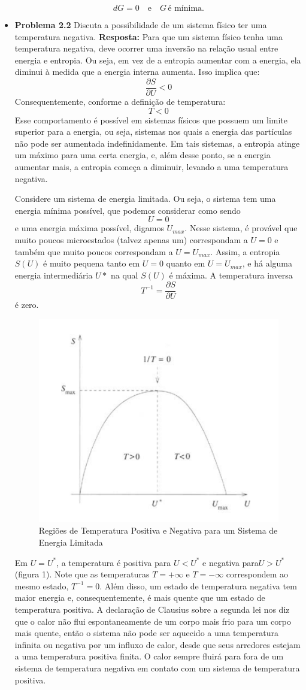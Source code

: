 \documentclass[12pt]{article}
\begin{document}
\begin{itemize}
    \[
    dG = 0 \quad \text{e} \quad G \, \text{é mínima}.
    \]
     \item \textbf{Problema 2.2} Discuta a possibilidade de um sistema físico ter uma temperatura negativa.
     \textbf{Resposta:} Para que um sistema físico tenha uma temperatura negativa, deve ocorrer uma inversão na relação usual entre energia e entropia. Ou seja, em vez de a entropia aumentar com a energia, ela diminui à medida que a energia interna aumenta. Isso implica que:
     \[
     \frac{\partial S}{\partial U} < 0
     \]
     Consequentemente, conforme a definição de temperatura:
     \[
     T < 0
     \]
     Esse comportamento é possível em sistemas físicos que possuem um limite superior para a energia, ou seja, sistemas nos quais a energia das partículas não pode ser aumentada indefinidamente. Em tais sistemas, a entropia atinge um máximo para uma certa energia, e, além desse ponto, se a energia aumentar mais, a entropia começa a diminuir, levando a uma temperatura negativa.
     
     Considere um sistema de energia limitada. Ou seja, o sistema tem uma energia mínima possível, que podemos considerar como sendo
     \[
     U = 0
     \]
     e uma energia máxima possível, digamos $U_{max}$. Nesse sistema, é provável que muito poucos microestados (talvez apenas um) correspondam a $U = 0$ e também que muito poucos correspondam a $U = U_{max}$. Assim, a entropia $S(U)$ é muito pequena tanto em $U = 0$ quanto em $U = U_{max}$, e há alguma energia intermediária $U*$ na qual $S(U)$ é máxima. A temperatura inversa 
     \[
     T^{-1} = \frac{\partial S}{\partial U}
     \]
     é zero.
     \begin{figure}
         \centering
         \includegraphics[width=0.5\linewidth]{image.png}
         \caption{Regiões de Temperatura Positiva e Negativa para um Sistema de Energia Limitada}
         \label{fig:enter-label}
     \end{figure}
Em $U = U^{*}$, a temperatura é positiva para $U < U^{*}$ e negativa para$ U > U^{*}$ (figura 1). Note que as temperaturas $T = +\infty$ e $T = -\infty $ correspondem ao mesmo estado, $T^{-1} = 0$. Além disso, um estado de temperatura negativa tem maior energia e, consequentemente, é mais quente que um estado de temperatura positiva. A declaração de Clausius sobre a segunda lei nos diz que o calor não flui espontaneamente de um corpo mais frio para um corpo mais quente, então o sistema não pode ser aquecido a uma temperatura infinita ou negativa por um influxo de calor, desde que seus arredores estejam a uma temperatura positiva finita. O calor sempre fluirá para fora de um sistema de temperatura negativa em contato com um sistema de temperatura positiva.


\end{itemize}
\end{document}
